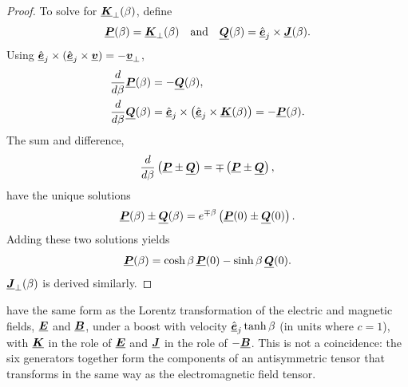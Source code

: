 \begin{proof}
To solve for $\Pv{K}_\perp(\beta)$, define
	$$\Pv{P}(\beta) = \Pv{K}_\perp(\beta) \quad \text{and} \quad \Pv{Q}(\beta) = \hat{\Pv{e}}_j \times \Pv{J}(\beta).$$
%
Using $\hat{\Pv{e}}_j \times (\hat{\Pv{e}}_j \times \Pv{v}) = -\Pv{v}_\perp$,
\begin{align*}
\frac{d}{d\beta} \Pv{P}(\beta) &= -\Pv{Q}(\beta), \\
\frac{d}{d\beta} \Pv{Q}(\beta) &= \hat{\Pv{e}}_j \times \left( \hat{\Pv{e}}_j \times \Pv{K}(\beta) \right) = -\Pv{P}(\beta).
\end{align*}
%
The sum and difference,
\begin{equation*}
\frac{d}{d\beta} \left( \Pv{P} \pm \Pv{Q} \right) = \mp \left( \Pv{P} \pm \Pv{Q} \right),
\end{equation*}
%
have the unique solutions
\begin{equation*}
\Pv{P}(\beta) \pm \Pv{Q}(\beta) = e^{\mp\beta} \left( \Pv{P}(0) \pm \Pv{Q}(0) \right).
\end{equation*}
%
Adding these two solutions yields
\begin{equation*}
\Pv{P}(\beta) = \cosh\beta \, \Pv{P}(0) - \sinh\beta \, \Pv{Q}(0).
\end{equation*}
%
$\Pv{J}_\perp(\beta)$ is derived similarly.
%
%
\end{proof}

 have the same form as the Lorentz transformation of
the electric and magnetic fields, $\Pv{E}$ and $\Pv{B}$, under a boost with velocity $\hat{\Pv{e}}_j \tanh\beta$ (in units where $c=1$),
with $\Pv{K}$ in the role of $\Pv{E}$ and $\Pv{J}$ in the role of $-\Pv{B}$.
%
This is not a coincidence: the six generators together form the components of an antisymmetric tensor
that transforms in the same way as the electromagnetic field tensor.

